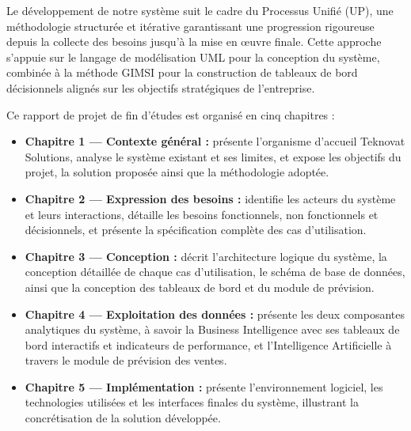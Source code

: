 Le développement de notre système suit le cadre du Processus Unifié (UP), une méthodologie 
structurée et itérative garantissant une progression rigoureuse depuis la collecte des besoins 
jusqu'à la mise en œuvre finale. Cette approche s'appuie sur le langage de modélisation UML 
pour la conception du système, combinée à la méthode GIMSI pour la construction de tableaux 
de bord décisionnels alignés sur les objectifs stratégiques de l'entreprise.

Ce rapport de projet de fin d'études est organisé en cinq chapitres :

\begin{itemize}
    \item \textbf{Chapitre 1 --- Contexte général :} présente l'organisme d'accueil
    Teknovat Solutions, analyse le système existant et ses limites, et expose les objectifs
    du projet, la solution proposée ainsi que la méthodologie adoptée.

    \item \textbf{Chapitre 2 --- Expression des besoins :} identifie les acteurs du système
    et leurs interactions, détaille les besoins fonctionnels, non fonctionnels et décisionnels,
    et présente la spécification complète des cas d'utilisation.

    \item \textbf{Chapitre 3 --- Conception :} décrit l'architecture logique du système, la
    conception détaillée de chaque cas d'utilisation, le schéma de base de données, ainsi que
    la conception des tableaux de bord et du module de prévision.

    \item \textbf{Chapitre 4 --- Exploitation des données :} présente les deux composantes
    analytiques du système, à savoir la Business Intelligence avec ses tableaux de bord
    interactifs et indicateurs de performance, et l'Intelligence Artificielle à travers
    le module de prévision des ventes.

    \item \textbf{Chapitre 5 --- Implémentation :} présente l'environnement logiciel, les
    technologies utilisées et les interfaces finales du système, illustrant la concrétisation
    de la solution développée.
\end{itemize}